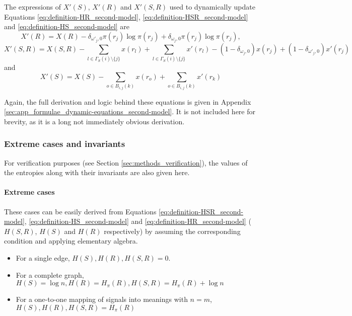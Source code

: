 The expressions of $X'(S)$, $X'(R)$ and $X'(S,R)$ used to dynamically update Equations \eqref{eq:definition-HR_second-model}, \eqref{eq:definition-HSR_second-model} and \eqref{eq:definition-HS_second-model} are
\begin{equation}
  \label{eq:definition-XR_second-model_dynamic}
  X'(R) = X(R) - \delta_{\omega'_j,0} \pi(r_j) \log \pi(r_j) + \delta_{\omega_j,0} \pi(r_j) \log \pi(r_j),
\end{equation}
\begin{equation}
  \label{eq:definition-XSR_second-model_dynamic}
  X'(S,R) = X(S,R) - \sum_{l \in \Gamma_S(i) \setminus \{ j \}} x(r_l) + \sum_{l \in \Gamma_S(i) \setminus \{ j \}} x'(r_l) - (1 - \delta_{\omega_j,0}) x(r_j) + (1 - \delta_{\omega'_j,0}) x'(r_j)
\end{equation}
and
\begin{equation}
  \label{eq:definition-XS_second-model_dynamic}
  X'(S) = X(S) - \sum_{o \in B_{i,j}(k)} x(r_o) + \sum_{o \in B_{i,j}(k)} x'(r_k)
\end{equation}

Again, the full derivation and logic behind these equations is given in Appendix \ref{sec:app_formulae_dynamic-equations_second-model}.
It is not included here for brevity, as it is a long not immediately obvious derivation.

\subsubsection{Extreme cases and invariants}
\label{sec:model_math_first-model_invariants}

For verification purposes (see Section \ref{sec:methods_verification}), the values of the entropies along with their invariants are also given here.

\paragraph{Extreme cases} These cases can be easily derived from Equations \eqref{eq:definition-HSR_second-model}, \eqref{eq:definition-HS_second-model} and \eqref{eq:definition-HR_second-model} ($H(S,R)$, $H(S)$ and $H(R)$ respectively) by assuming the corresponding condition and applying elementary algebra.

\begin{itemize}
\item For a single edge, $H(S), H(R), H(S,R) = 0$.
\item For a complete graph, $H(S) = \log n, H(R) = H_\pi(R), H(S,R) = H_\pi(R) + \log n$
\item For a one-to-one mapping of signals into meanings with $n=m$, $H(S), H(R), H(S,R) = H_\pi(R)$
\end{itemize}

